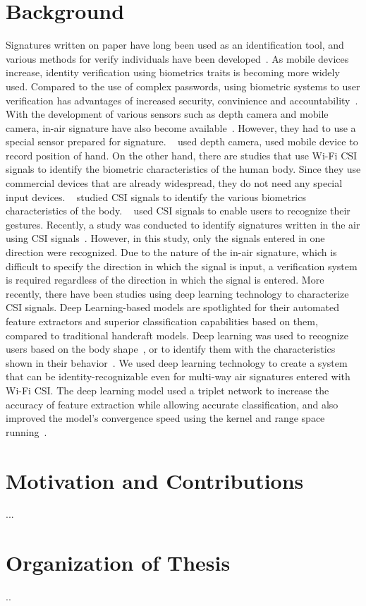 \section{Background}
Signatures written on paper have long been used as an identification tool, and various methods for verify individuals have been developed~\cite{fahmy2010online,galbally2015line,sanmorino2012survey,sesa2012information}.
As mobile devices increase, identity verification using biometrics traits is becoming more widely used.
Compared to the use of complex passwords, using biometric systems to user verification has advantages of increased security, convinience and accountability~\cite{hutton2004biometrics}.
With the development of various sensors such as depth camera and mobile camera, in-air signature have also become available~\cite{bailador2011analysis}. However, they had to use a special sensor prepared for signature. ~\cite{jeon2012system,malik20183dairsig} used depth camera, \cite{ketabdar2012magnetic} used mobile device to record position of hand.
On the other hand, there are studies that use Wi-Fi CSI signals to identify the biometric characteristics of the human body. Since they use commercial devices that are already widespread, they do not need any special input devices.
~\cite{hong2016wfid,liu2015tracking,yousefi2017survey} studied CSI signals to identify the various biometrics characteristics of the body. ~\cite{abdelnasser2015wigest,nandakumar2014wi} used CSI signals to enable users to recognize their gestures.
Recently, a study was conducted to identify signatures written in the air using CSI signals~\cite{moon2017air}. However, in this study, only the signals entered in one direction were recognized. Due to the nature of the in-air signature, which is difficult to specify the direction in which the signal is input, a verification system is required regardless of the direction in which the signal is entered.
More recently, there have been studies using deep learning technology to characterize CSI signals. Deep Learning-based models are spotlighted for their automated feature extractors and superior classification capabilities based on them, compared to traditional handcraft models. Deep learning was used to recognize users based on the body shape~\cite{pokkunuru2018neuralwave}, or to identify them with the characteristics shown in their behavior~\cite{shi2017smart}.
We used deep learning technology to create a system that can be identity-recognizable even for multi-way air signatures entered with Wi-Fi CSI.
The deep learning model used a triplet network to increase the accuracy of feature extraction while allowing accurate classification, and also improved the model's convergence speed using the kernel and range space running~\cite{toh2018gradient}.

\section{Motivation and Contributions}
...
\newpage
\section{Organization of Thesis}
..